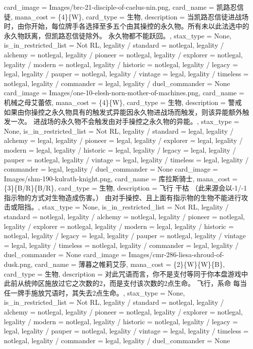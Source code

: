 \documentclass[lang = cn, color = black, 10pt]{AllThatStax}
\begin{document}
\card
{
	card_image = Images/brc-21-disciple-of-caelus-nin.png,
	card_name = 凯路忍信徒,
	mana_cost = \{4\}\{W\},
	card_type = 生物,
	description = 当凯路忍信徒进战场时，由你开始，每位牌手各选择至多五个由其操控的永久物。所有未以此法选中的永久物跃离，但凯路忍信徒除外。
	永久物都不能跃回。,
	stax_type = None,
	is_in_restricted_list = Not RL,
	legality / standard = notlegal,
	legality / alchemy = notlegal,
	legality / pioneer = notlegal,
	legality / explorer = notlegal,
	legality / modern = notlegal,
	legality / historic = notlegal,
	legality / legacy = legal,
	legality / pauper = notlegal,
	legality / vintage = legal,
	legality / timeless = notlegal,
	legality / commander = legal,
	legality / duel_commander = None
}
\card
{
	card_image = Images/one-10-elesh-norn-mother-of-machines.png,
	card_name = 机械之母艾蕾侬,
	mana_cost = \{4\}\{W\},
	card_type = 生物,
	description = 警戒
	如果由你操控之永久物具有的触发式异能因永久物进战场而触发，则该异能额外触发一次。
	进战场的永久物不会触发由对手操控之永久物的异能。,
	stax_type = None,
	is_in_restricted_list = Not RL,
	legality / standard = legal,
	legality / alchemy = legal,
	legality / pioneer = legal,
	legality / explorer = legal,
	legality / modern = legal,
	legality / historic = legal,
	legality / legacy = legal,
	legality / pauper = notlegal,
	legality / vintage = legal,
	legality / timeless = legal,
	legality / commander = legal,
	legality / duel_commander = None
}
\card
{
	card_image = Images/shm-190-kulrath-knight.png,
	card_name = 库拉斯骑士,
	mana_cost = \{3\}\{B/R\}\{B/R\},
	card_type = 生物,
	description = 飞行
	干枯 （此来源会以-1/-1指示物的方式对生物造成伤害。）
	由对手操控、且上面有指示物的生物不能进行攻击或阻挡。,
	stax_type = None,
	is_in_restricted_list = Not RL,
	legality / standard = notlegal,
	legality / alchemy = notlegal,
	legality / pioneer = notlegal,
	legality / explorer = notlegal,
	legality / modern = legal,
	legality / historic = notlegal,
	legality / legacy = legal,
	legality / pauper = notlegal,
	legality / vintage = legal,
	legality / timeless = notlegal,
	legality / commander = legal,
	legality / duel_commander = None
}
\card
{
	card_image = Images/cmr-286-liesa-shroud-of-dusk.png,
	card_name = 薄暮之帷莉艾莎,
	mana_cost = \{2\}\{W\}\{W\}\{B\},
	card_type = 生物,
	description = 对此咒语而言，你不是支付等同于你本盘游戏中此前从统帅区施放过它之次数的{2}，而是支付该次数的2点生命。
	飞行，系命
	每当任一牌手施放咒语时，其失去2点生命。,
	stax_type = None,
	is_in_restricted_list = Not RL,
	legality / standard = notlegal,
	legality / alchemy = notlegal,
	legality / pioneer = notlegal,
	legality / explorer = notlegal,
	legality / modern = notlegal,
	legality / historic = notlegal,
	legality / legacy = legal,
	legality / pauper = notlegal,
	legality / vintage = legal,
	legality / timeless = notlegal,
	legality / commander = legal,
	legality / duel_commander = None
}
\end{document}
